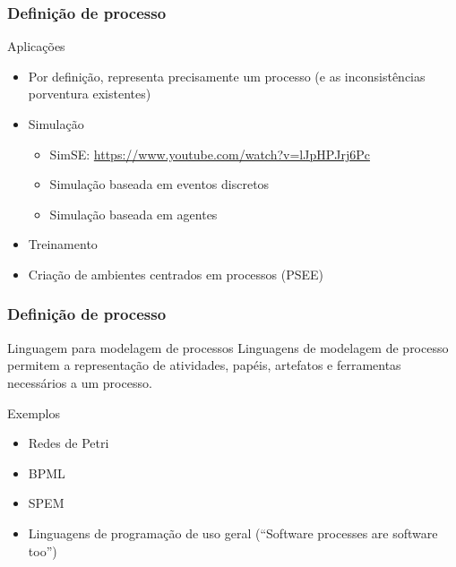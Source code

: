 \begin{frame}[parent={ie:agenda}, hasnext=true, hasprev=false]
\frametitle{Definição de processo}

\begin{block:fact}{Aplicações}
	\begin{itemize}
		\item Por definição, representa precisamente um processo (e as inconsistências
		porventura existentes)
		
		\item Simulação
		\begin{itemize}
			\item SimSE:  \url{https://www.youtube.com/watch?v=lJpHPJrj6Pc}
			\item Simulação baseada em eventos discretos
			\item Simulação baseada em agentes
		\end{itemize}
		
		\item Treinamento
		
		\item Criação de ambientes centrados em processos (PSEE)
	\end{itemize}
\end{block:fact}
\end{frame}

\begin{frame}[hasnext=true, hasprev=true]
	\frametitle{Definição de processo}

	
	\begin{block:concept}{Linguagem para modelagem de processos}
		Linguagens de modelagem de processo permitem a representação de atividades,
		papéis, artefatos e ferramentas necessários a um processo.
	\end{block:concept}
	
	\begin{block:fact}{Exemplos}
		\begin{itemize}
			\item Redes de Petri
			\item BPML
			\item SPEM
			\item Linguagens de programação de uso geral (``Software processes are software too'')
		\end{itemize}
	\end{block:fact}
\end{frame}


